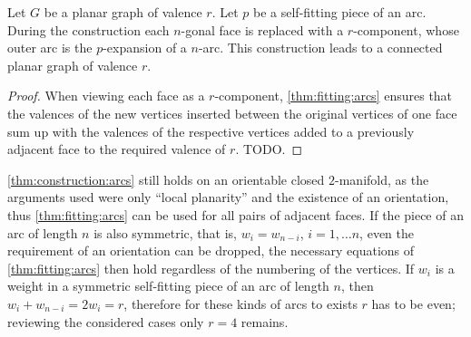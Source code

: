 \begin{construction}\label{thm:construction:arcs} Let $G$ be a planar graph of valence $r$. Let $p$ be a self-fitting piece of an arc. During the construction each $n$-gonal face is replaced with a $r$-component, whose outer arc is the $p$-expansion of a $n$-arc. This construction leads to a connected planar graph of valence $r$.
  \begin{proof}
    When viewing each face as a $r$-component, \autoref{thm:fitting:arcs} ensures that the valences of the new vertices inserted between the original vertices of one face sum up with the valences of the respective vertices added to a previously adjacent face to the required valence of $r$. TODO.
  \end{proof}
\end{construction}

\begin{remark}
  \autoref{thm:construction:arcs} still holds on an orientable closed $2$-manifold, as the arguments used were only ``local planarity'' and the existence of an orientation, thus \autoref{thm:fitting:arcs} can be used for all pairs of adjacent faces. If the piece of an arc of length $n$ is also symmetric, that is, $w_i = w_{n-i}$, $i = 1, \dots n$, even the requirement of an orientation can be dropped, the necessary equations of \autoref{thm:fitting:arcs} then hold regardless of the numbering of the vertices. If $w_i$ is a weight in a symmetric self-fitting piece of an arc of length $n$, then $w_i + w_{n-i} = 2 w_i = r$, therefore for these kinds of arcs to exists $r$ has to be even; reviewing the considered cases only $r = 4$ remains.
\end{remark}
